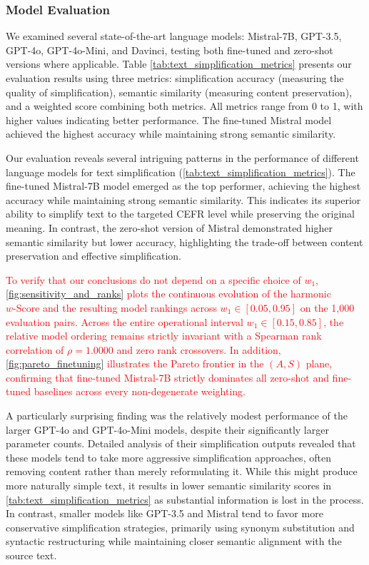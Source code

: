 \subsubsection{Model Evaluation}
We examined several state-of-the-art language models: Mistral-7B, GPT-3.5, GPT-4o, GPT-4o-Mini, and Davinci, testing both fine-tuned and zero-shot versions where applicable. Table \ref{tab:text_simplification_metrics} presents our evaluation results using three metrics: simplification accuracy (measuring the quality of simplification), semantic similarity (measuring content preservation), and a weighted score combining both metrics. All metrics range from 0 to 1, with higher values indicating better performance. The fine-tuned Mistral model achieved the highest accuracy while maintaining strong semantic similarity.



Our evaluation reveals several intriguing patterns in the performance of different language models for text simplification (\autoref{tab:text_simplification_metrics}). The fine-tuned Mistral-7B model emerged as the top performer, achieving the highest accuracy while maintaining strong semantic similarity. This indicates its superior ability to simplify text to the targeted CEFR level while preserving the original meaning. In contrast, the zero-shot version of Mistral demonstrated higher semantic similarity but lower accuracy, highlighting the trade-off between content preservation and effective simplification.

\textcolor{red}{To verify that our conclusions do not depend on a specific choice of $w_1$, \autoref{fig:sensitivity_and_ranks} plots the continuous evolution of the harmonic $w\text{-Score}$ and the resulting model rankings across $w_1 \in [0.05, 0.95]$ on the 1,000 evaluation pairs. Across the entire operational interval $w_1 \in [0.15, 0.85]$, the relative model ordering remains strictly invariant with a Spearman rank correlation of $\rho = 1.0000$ and zero rank crossovers. In addition, \autoref{fig:pareto_finetuning} illustrates the Pareto frontier in the $(A, S)$ plane, confirming that fine-tuned Mistral-7B strictly dominates all zero-shot and fine-tuned baselines across every non-degenerate weighting.}

A particularly surprising finding was the relatively modest performance of the larger GPT-4o and GPT-4o-Mini models, despite their significantly larger parameter counts. Detailed analysis of their simplification outputs revealed that these models tend to take more aggressive simplification approaches, often removing content rather than merely reformulating it. While this might produce more naturally simple text, it results in lower semantic similarity scores in \autoref{tab:text_simplification_metrics} as substantial information is lost in the process. In contrast, smaller models like GPT-3.5 and Mistral tend to favor more conservative simplification strategies, primarily using synonym substitution and syntactic restructuring while maintaining closer semantic alignment with the source text.

